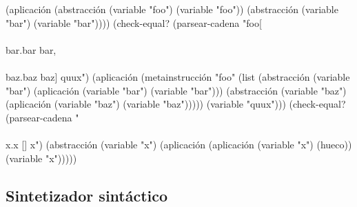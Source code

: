\documentclass[10pt,oneside,openany,letterpaper]{book}
\begin{document}
                (aplicación (abstracción (variable "foo")
                                         (variable "foo"))
                            (abstracción (variable "bar")
                                         (variable "bar"))))
  (check-equal? (parsear-cadena "foo[\\\\bar.bar bar, \\\\baz.baz baz] quux")
                (aplicación
                 (metainstrucción "foo"
                                  (list (abstracción (variable "bar")
                                                     (aplicación (variable "bar")
                                                                 (variable "bar")))
                                        (abstracción (variable "baz")
                                                     (aplicación (variable "baz")
                                                                 (variable "baz")))))
                 (variable "quux")))
  (check-equal? (parsear-cadena "\\\\x.x [] x")
                (abstracción (variable "x")
                             (aplicación (aplicación (variable "x") (hueco))
                                         (variable "x")))))
\nwendcode{}\nwdocspar

\subsection{Sintetizador sintáctico}
\end{document}
